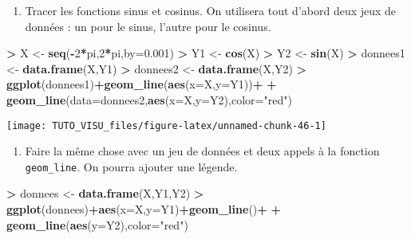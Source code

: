 \documentclass[]{book}
\newenvironment{Shaded}{\begin{snugshade}}{\end{snugshade}}
\newcommand{\DataTypeTok}[1]{\textcolor[rgb]{0.13,0.29,0.53}{#1}}
\newcommand{\DecValTok}[1]{\textcolor[rgb]{0.00,0.00,0.81}{#1}}
\newcommand{\FloatTok}[1]{\textcolor[rgb]{0.00,0.00,0.81}{#1}}
\newcommand{\KeywordTok}[1]{\textcolor[rgb]{0.13,0.29,0.53}{\textbf{#1}}}
\newcommand{\NormalTok}[1]{#1}
\newcommand{\OperatorTok}[1]{\textcolor[rgb]{0.81,0.36,0.00}{\textbf{#1}}}
\newcommand{\StringTok}[1]{\textcolor[rgb]{0.31,0.60,0.02}{#1}}
\providecommand{\tightlist}{%
  \setlength{\itemsep}{0pt}\setlength{\parskip}{0pt}}
\theoremstyle{definition}
\theoremstyle{definition}
\theoremstyle{definition}
\theoremstyle{remark}
\begin{document}
\begin{enumerate}
\def\labelenumi{\arabic{enumi}.}
\tightlist
\item
  Tracer les fonctions sinus et cosinus. On utilisera tout d'abord deux jeux de données : un pour le sinus, l'autre pour le cosinus.
\end{enumerate}

\begin{Shaded}
\begin{Highlighting}[]
\OperatorTok{>}\StringTok{ }\NormalTok{X <-}\StringTok{ }\KeywordTok{seq}\NormalTok{(}\OperatorTok{-}\DecValTok{2}\OperatorTok{*}\NormalTok{pi,}\DecValTok{2}\OperatorTok{*}\NormalTok{pi,}\DataTypeTok{by=}\FloatTok{0.001}\NormalTok{)}
\OperatorTok{>}\StringTok{ }\NormalTok{Y1 <-}\StringTok{ }\KeywordTok{cos}\NormalTok{(X)}
\OperatorTok{>}\StringTok{ }\NormalTok{Y2 <-}\StringTok{ }\KeywordTok{sin}\NormalTok{(X)}
\OperatorTok{>}\StringTok{ }\NormalTok{donnees1 <-}\StringTok{ }\KeywordTok{data.frame}\NormalTok{(X,Y1)}
\OperatorTok{>}\StringTok{ }\NormalTok{donnees2 <-}\StringTok{ }\KeywordTok{data.frame}\NormalTok{(X,Y2)}
\OperatorTok{>}\StringTok{ }\KeywordTok{ggplot}\NormalTok{(donnees1)}\OperatorTok{+}\KeywordTok{geom_line}\NormalTok{(}\KeywordTok{aes}\NormalTok{(}\DataTypeTok{x=}\NormalTok{X,}\DataTypeTok{y=}\NormalTok{Y1))}\OperatorTok{+}
\OperatorTok{+}\StringTok{   }\KeywordTok{geom_line}\NormalTok{(}\DataTypeTok{data=}\NormalTok{donnees2,}\KeywordTok{aes}\NormalTok{(}\DataTypeTok{x=}\NormalTok{X,}\DataTypeTok{y=}\NormalTok{Y2),}\DataTypeTok{color=}\StringTok{"red"}\NormalTok{)}
\end{Highlighting}
\end{Shaded}

\begin{center}\texttt{[image: TUTO\_VISU\_files/figure-latex/unnamed-chunk-46-1]} \end{center}

\begin{enumerate}
\def\labelenumi{\arabic{enumi}.}
\setcounter{enumi}{1}
\tightlist
\item
  Faire la même chose avec un jeu de données et deux appels à la fonction \texttt{geom\_line}. On pourra ajouter une légende.
\end{enumerate}

\begin{Shaded}
\begin{Highlighting}[]
\OperatorTok{>}\StringTok{ }\NormalTok{donnees <-}\StringTok{ }\KeywordTok{data.frame}\NormalTok{(X,Y1,Y2)}
\OperatorTok{>}\StringTok{ }\KeywordTok{ggplot}\NormalTok{(donnees)}\OperatorTok{+}\KeywordTok{aes}\NormalTok{(}\DataTypeTok{x=}\NormalTok{X,}\DataTypeTok{y=}\NormalTok{Y1)}\OperatorTok{+}\KeywordTok{geom_line}\NormalTok{()}\OperatorTok{+}
\OperatorTok{+}\StringTok{   }\KeywordTok{geom_line}\NormalTok{(}\KeywordTok{aes}\NormalTok{(}\DataTypeTok{y=}\NormalTok{Y2),}\DataTypeTok{color=}\StringTok{"red"}\NormalTok{)}
\end{Highlighting}
\end{Shaded}
\end{document}
